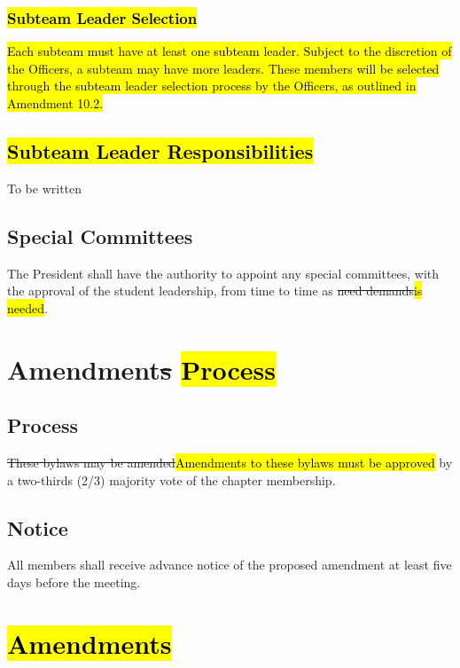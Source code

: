 \documentclass[12pt, a4paper]{article}
\begin{document}
\subsubsection{\hl{Subteam Leader Selection}}
\hl{Each subteam must have at least one subteam leader. 
Subject to the discretion of the Officers, a subteam may have more leaders. 
These members will be selected through the subteam leader selection process by the Officers, as outlined in Amendment 10.2.}

\subsection{\hl{Subteam Leader Responsibilities}}
To be written

\subsection{Special Committees}
The President shall have the authority to appoint any special committees, with the approval of the student leadership, from time to time as \st{need demands}\hl{is needed}.

\section{Amendment\st{s} \hl{Process}}
\subsection{Process}
\st{These bylaws may be amended}\hl{Amendments to these bylaws must be approved} by a two-thirds (2/3) majority vote of the chapter membership.

\subsection{Notice}
All members shall receive advance notice of the proposed amendment at least five days before the meeting. 

\section{\hl{Amendments}}
\end{document}
